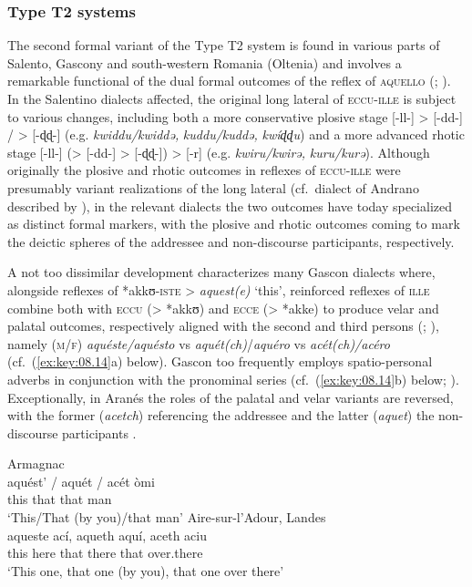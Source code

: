 \documentclass[output=paper]{langsci/langscibook}
\begin{document}
\subsubsection{\label{bkm:Ref370497195}Type T2 systems}

The second formal variant of the Type T2 system is found in various parts of
Salento, Gascony and south-western Romania (Oltenia) and involves a remarkable
functional  of the dual formal outcomes of the reflex of
\textsc{aquello} (\citealt[159f]{Mancarella:1998a};
\citealt[§2.2.1.1]{Sornicola:2011a}). In the Salentino
dialects affected, the original long lateral of \textsc{eccu-ille} is subject
to various changes, including both a more conservative plosive stage [-ll-] >
[\nobreakdash-dd\nobreakdash-] / > [-ɖɖ{}-] (e.g. \emph{kwiddu/kwiddə,}
\emph{kuddu/kuddə,} \emph{kwíɖɖu}) and a more advanced rhotic stage [-ll-] (>
[-dd-] > [\nobreakdash-ɖɖ-]) > [-r] (e.g. \emph{kwiru/kwirə,}
\emph{kuru/kurə}). Although originally the plosive and rhotic outcomes in
reflexes of \textsc{eccu-ille} were presumably variant realizations of the long
lateral (cf.\ dialect of Andrano described by \citealt[157]{Mancarella:1998a}),
in the relevant dialects the two outcomes have today specialized as distinct
formal markers, with the plosive and rhotic outcomes coming to mark the deictic
spheres of the addressee and non-discourse participants, respectively.

A not too dissimilar development characterizes many Gascon dialects where,
alongside reflexes of *akkʊ-\textsc{iste} > \emph{aquest(e)} ‘this’, reinforced
reflexes of \textsc{ille} combine both with \textsc{eccu} (> *akkʊ) and
\textsc{ecce} (> *akke) to produce velar and palatal outcomes, respectively
aligned with the second and third persons (\citealt[188]{Rohlfs:1970ab};
\citealt[§2.2.1.1]{Sornicola:2011a}), namely
(\textsc{m}/\textsc{f}) \emph{aquéste/aquésto} vs
\emph{aquét(ch)}/\emph{aquéro} vs \emph{acét(ch)/acéro} (cf.\ (\ref{ex:key:08.14}a) below). Gascon
too frequently employs spatio-personal adverbs in conjunction with the
pronominal series (cf.\ (\ref{ex:key:08.14}b) below; \citealt[34]{Dauge:2000a}). Exceptionally, in
Aranés the roles of the palatal and velar variants are reversed, with the
former (\emph{acetch}) referencing the addressee and the latter (\emph{aquet})
the non-discourse participants \citep[188, n.\ 323]{Rohlfs:1970ab}.

\ea\label{bkm:Ref370499020}\label{ex:key:08.14}
    \ea  Armagnac \citep{Rohlfs:1970ab}\\
    \gll      aquést’ /  aquét /  acét  òmi\\
            this  {} that {} that  man\\
        \glt \enquote*{This/That (by you)/that man}
    \ex Aire-sur-l’Adour, Landes \citep{Dauge:2000a}\\
    \gll      aqueste  ací,  aqueth  aquí,  aceth  aciu\\
                 this  here  that  there  that  over.there\\
        \glt \enquote*{This one, that one (by you), that one over there}
    \z
\z
\end{document}
